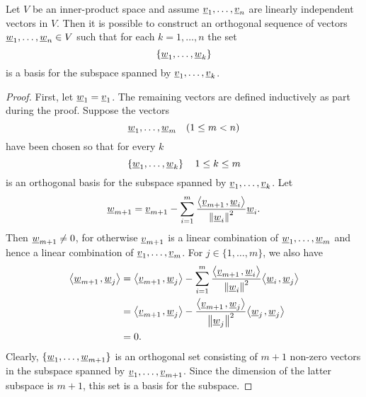 \begin{theorem}
Let $V$ be an inner-product space and assume $\underline{v}_1, \ldots, \underline{v}_n$ are linearly independent vectors in $V$.
Then it is possible to construct an orthogonal sequence of vectors $\underline{w}_1, \ldots, \underline{w}_n \in V$ such that for each $k = 1, \ldots, n$ the set
\begin{equation*}
\left\{ \underline{w}_1, \ldots, \underline{w}_k \right\}
\end{equation*}
is a basis for the subspace spanned by $\underline{v}_1, \ldots, \underline{v}_k$.
\end{theorem}
\begin{proof}
First, let $\underline{w}_1 = \underline{v}_1$.
The remaining vectors are defined inductively as part during the proof.
Suppose the vectors
\begin{equation*}
\underline{w}_1, \ldots, \underline{w}_m \quad (1 \leq m < n)
\end{equation*}
have been chosen so that for every $k$
\begin{equation*}
\left\{ \underline{w}_1, \ldots, \underline{w}_k \right\} \quad 1 \leq k \leq m
\end{equation*}
is an orthogonal basis for the subspace spanned by $\underline{v}_1, \ldots, \underline{v}_k$.
Let
\begin{equation*}
\underline{w}_{m+1} = \underline{v}_{m+1} - \sum_{i=1}^m \frac{ {\left\langle  \underline{v}_{m+1}  \mskip2mu ,  \underline{w}_i  \right\rangle} } { \left\| \underline{w}_i \right\|^2 } \underline{w}_i.
\end{equation*}
Then $\underline{w}_{m+1} \neq 0$, for otherwise $\underline{v}_{m+1}$ is a linear combination of $\underline{w}_1, \ldots, \underline{w}_m$ and hence a linear combination of $\underline{v}_1, \ldots, \underline{v}_m$.
For $j \in \{1, \ldots, m\}$, we also have
\begin{equation*}
\begin{split}
{\left\langle  \underline{w}_{m+1}  \mskip2mu ,  \underline{w}_j  \right\rangle}
&= {\left\langle  \underline{v}_{m+1}  \mskip2mu ,  \underline{w}_j  \right\rangle}
- \sum_{i=1}^m \frac{ {\left\langle  \underline{v}_{m+1}  \mskip2mu ,  \underline{w}_i  \right\rangle} } { \left\| \underline{w}_i \right\|^2 }
{\left\langle  \underline{w}_i  \mskip2mu ,  \underline{w}_j  \right\rangle} \\
&= {\left\langle  \underline{v}_{m+1}  \mskip2mu ,  \underline{w}_j  \right\rangle}
- \frac{ {\left\langle  \underline{v}_{m+1}  \mskip2mu ,  \underline{w}_j  \right\rangle} } { \left\| \underline{w}_j \right\|^2 }
{\left\langle  \underline{w}_j  \mskip2mu ,  \underline{w}_j  \right\rangle} \\
&= 0.
\end{split}
\end{equation*}
Clearly, $\{ \underline{w}_1, \ldots, \underline{w}_{m+1} \}$ is an orthogonal set consisting of $m+1$ non-zero vectors in the subspace spanned by $\underline{v}_1, \ldots, \underline{v}_{m+1}$.
Since the dimension of the latter subspace is $m+1$, this set is a basis for the subspace.
\end{proof}

